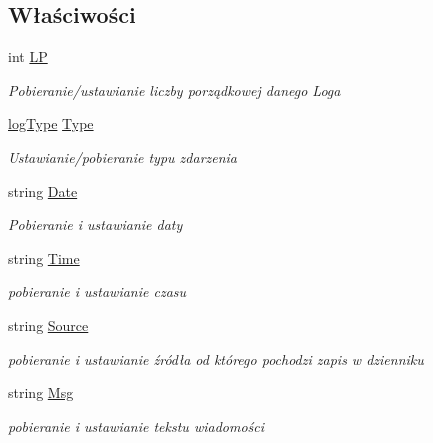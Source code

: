 \subsection*{Właściwości}
\begin{DoxyCompactItemize}
\item 
int \hyperlink{class_z_s_t_1_1_log_a32b5d39256faebe185d88889f75f9e87}{L\+P}
\begin{DoxyCompactList}\small\item\em Pobieranie/ustawianie liczby porządkowej danego Loga \end{DoxyCompactList}\item 
\hyperlink{class_z_s_t_1_1_log_aefc9edf31eecb73ccb4c0ef6077b85fe}{log\+Type} \hyperlink{class_z_s_t_1_1_log_acbdc6d736db18eb65a7d80b94d03be07}{Type}
\begin{DoxyCompactList}\small\item\em Ustawianie/pobieranie typu zdarzenia \end{DoxyCompactList}\item 
string \hyperlink{class_z_s_t_1_1_log_a18e6ee60e833732b553f991aca086217}{Date}
\begin{DoxyCompactList}\small\item\em Pobieranie i ustawianie daty \end{DoxyCompactList}\item 
string \hyperlink{class_z_s_t_1_1_log_a80ca6c06e14d09edc94cbd0c0e21b8ee}{Time}
\begin{DoxyCompactList}\small\item\em pobieranie i ustawianie czasu \end{DoxyCompactList}\item 
string \hyperlink{class_z_s_t_1_1_log_a341d360d9362ea78c23dcfdde1ad3075}{Source}
\begin{DoxyCompactList}\small\item\em pobieranie i ustawianie źródła od którego pochodzi zapis w dzienniku \end{DoxyCompactList}\item 
string \hyperlink{class_z_s_t_1_1_log_a66573e9f4fe9a03aa42c2106b23c7b69}{Msg}
\begin{DoxyCompactList}\small\item\em pobieranie i ustawianie tekstu wiadomości \end{DoxyCompactList}\end{DoxyCompactItemize}


